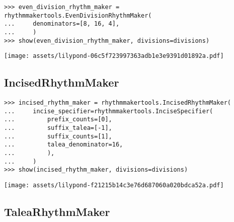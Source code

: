 \begin{comment}
<abjad>
even_division_rhythm_maker = rhythmmakertools.EvenDivisionRhythmMaker(
    denominators=[8, 16, 4],
    )
show(even_division_rhythm_maker, divisions=divisions)
</abjad>
\end{comment}

\begin{singlespacing}
\vspace{-0.5\baselineskip}
\begin{lstlisting}
>>> even_division_rhythm_maker = rhythmmakertools.EvenDivisionRhythmMaker(
...     denominators=[8, 16, 4],
...     )
>>> show(even_division_rhythm_maker, divisions=divisions)
\end{lstlisting}
\texttt{[image: assets/lilypond-06c5f723997363adb1e3e9391d01892a.pdf]}
\end{singlespacing}

\subsection{IncisedRhythmMaker}

\begin{comment}
<abjad>
incised_rhythm_maker = rhythmmakertools.IncisedRhythmMaker(
    incise_specifier=rhythmmakertools.InciseSpecifier(
        prefix_counts=[0],
        suffix_talea=[-1],
        suffix_counts=[1],
        talea_denominator=16,
        ),
    )
show(incised_rhythm_maker, divisions=divisions)
</abjad>
\end{comment}

\begin{singlespacing}
\vspace{-0.5\baselineskip}
\begin{lstlisting}
>>> incised_rhythm_maker = rhythmmakertools.IncisedRhythmMaker(
...     incise_specifier=rhythmmakertools.InciseSpecifier(
...         prefix_counts=[0],
...         suffix_talea=[-1],
...         suffix_counts=[1],
...         talea_denominator=16,
...         ),
...     )
>>> show(incised_rhythm_maker, divisions=divisions)
\end{lstlisting}
\texttt{[image: assets/lilypond-f21215b14c3e76d687060a020bdca52a.pdf]}
\end{singlespacing}

\subsection{TaleaRhythmMaker}

